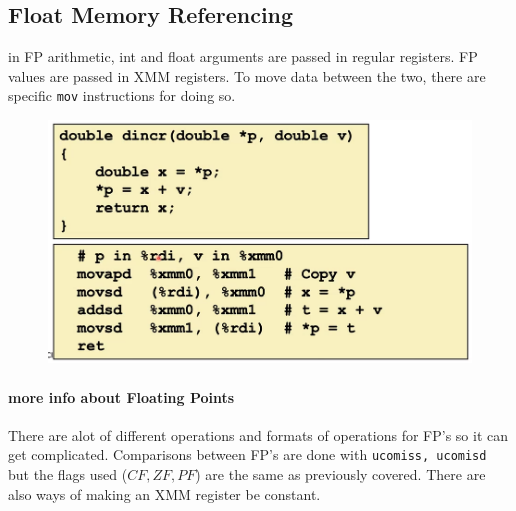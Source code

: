 \documentclass[12pt]{book}
\begin{document}
\subsection*{Float Memory Referencing}
in FP arithmetic, int and float arguments are passed in regular registers. FP values are 
passed in XMM registers. To move data between the two, there are specific \texttt{mov} 
instructions for doing so.
\begin{figure}[h]
        \centering
        \includegraphics[scale = 0.4]{./figures/floatMov}
\end{figure}

\paragraph{more info about Floating Points}
There are alot of different operations and formats of operations for FP's so it can get 
complicated. Comparisons between FP's are done with \texttt{ucomiss, ucomisd} but the 
flags used ($CF, ZF, PF$) are the same as previously covered. There are also ways
of making an XMM register be constant.
\end{document}
